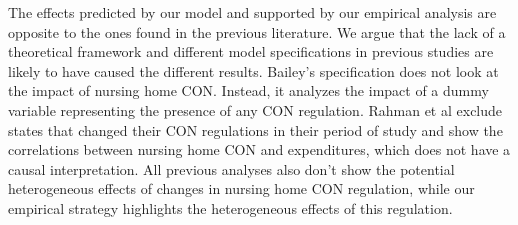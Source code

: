 \documentclass[../Main.tex]{subfiles}
\begin{document}
\indent The effects predicted by our model and supported by our empirical analysis are opposite to the ones found in the previous literature. We argue that the lack of a theoretical framework and different model specifications in previous studies are likely to have caused the different results. Bailey’s specification does not look at the impact of nursing home CON. Instead, it analyzes the impact of a dummy variable representing the presence of any CON regulation. Rahman et al exclude states that changed their CON regulations in their period of study and show the correlations between nursing home CON and expenditures, which does not have a causal interpretation. All previous analyses also don’t show the potential heterogeneous effects of changes in nursing home CON regulation, while our empirical strategy highlights the heterogeneous effects of this regulation. 
\end{document}
